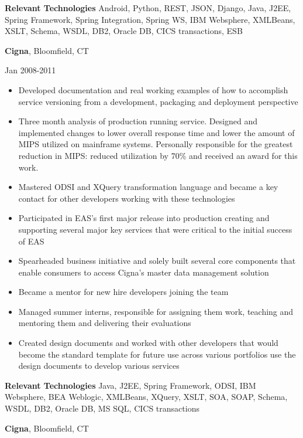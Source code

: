 \documentclass[a4paper,online]{adcv}
\begin{document}
\begin{adcvtabletwo}
\begin{itemize}
  \end{itemize}
  \adcvrowskip
  \textbf{Relevant Technologies} Android, Python, REST, JSON, Django, Java, J2EE, Spring Framework, Spring Integration, Spring WS, IBM Websphere, XMLBeans, XSLT, Schema, WSDL, DB2, Oracle DB, CICS transactions, ESB
  
  \adcvrowskip
  {\textbf{Cigna}, Bloomfield, CT}
  
   {Jan 2008-2011}
  \begin{itemize}
    \item Developed documentation and real working examples of how to accomplish service versioning from a development, packaging and deployment perspective
    \item Three month analysis of production running service.  Designed and implemented changes to lower overall response time and lower the amount of MIPS utilized on mainframe systems. Personally responsible for the greatest reduction in MIPS: reduced utilization by 70\% and received an award for this work.
    \item Mastered ODSI and XQuery transformation language and became a key contact for other developers working with these technologies
    \item Participated in EAS's first major release into production creating and supporting several major key services that were critical to the initial success of EAS
    \item Spearheaded business initiative and solely built several core components that enable consumers to access Cigna's master data management solution
    \item Became a mentor for new hire developers joining the team
    \item Managed summer interns, responsible for assigning them work, teaching and mentoring them and delivering their evaluations
    \item Created design documents and worked with other developers that would become the standard template for future use across various portfolios use the design documents to develop various services

  \end{itemize}
  \adcvrowskip
  \textbf{Relevant Technologies} Java, J2EE, Spring Framework, ODSI, IBM Websphere, BEA Weblogic, XMLBeans, XQuery, XSLT, SOA, SOAP, Schema, WSDL, DB2, Oracle DB, MS SQL, CICS transactions
  
  \adcvrowskip
  {\textbf{Cigna}, Bloomfield, CT}
  

\end{adcvtabletwo}
\end{document}
